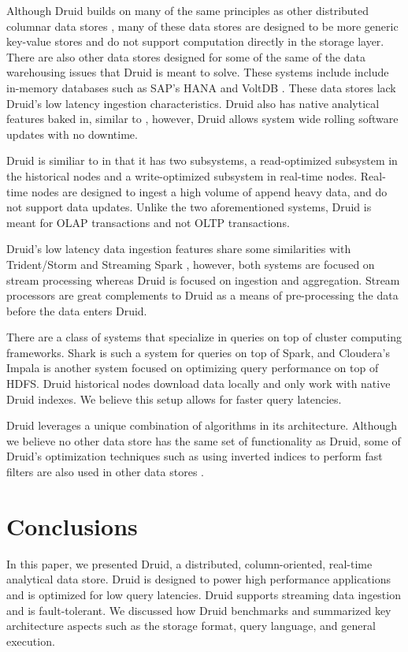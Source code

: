\documentclass{acm_proc_article-sp}
\begin{document}
Although Druid builds on many of the same principles as other distributed
columnar data stores \cite{fink2012distributed}, many of these data stores are
designed to be more generic key-value stores \cite{lakshman2010cassandra} and do not
support computation directly in the storage layer.  There are also other data
stores designed for some of the same of the data warehousing issues that Druid
is meant to solve. These systems include include in-memory databases such as
SAP’s HANA \cite{farber2012sap} and VoltDB \cite{voltdb2010voltdb}. These data
stores lack Druid's low latency ingestion characteristics. Druid also has
native analytical features baked in, similar to \cite{paraccel2013}, however,
Druid allows system wide rolling software updates with no downtime.  

Druid is similiar to \cite{stonebraker2005c, cipar2012lazybase} in that it has
two subsystems, a read-optimized subsystem in the historical nodes and a
write-optimized subsystem in real-time nodes. Real-time nodes are designed to
ingest a high volume of append heavy data, and do not support data updates.
Unlike the two aforementioned systems, Druid is meant for OLAP transactions and
not OLTP transactions.

Druid's low latency data ingestion features share some similarities with
Trident/Storm \cite{marz2013storm} and Streaming Spark
\cite{zaharia2012discretized}, however, both systems are focused on stream
processing whereas Druid is focused on ingestion and aggregation. Stream
processors are great complements to Druid as a means of pre-processing the data
before the data enters Druid.

There are a class of systems that specialize in queries on top of cluster
computing frameworks.  Shark \cite{engle2012shark} is such a system for queries
on top of Spark, and Cloudera's Impala \cite{cloudera2013} is another system
focused on optimizing query performance on top of HDFS. Druid historical nodes
download data locally and only work with native Druid indexes. We believe this
setup allows for faster query latencies.

Druid leverages a unique combination of algorithms in its
architecture. Although we believe no other data store has the same set
of functionality as Druid, some of Druid’s optimization techniques such as using
inverted indices to perform fast filters are also used in other data
stores \cite{macnicol2004sybase}.

\newpage
\section{Conclusions}
\label{sec:conclusions}
In this paper, we presented Druid, a distributed, column-oriented, real-time
analytical data store. Druid is designed to power high performance applications
and is optimized for low query latencies. Druid supports streaming data
ingestion and is fault-tolerant. We discussed how Druid benchmarks and
summarized key architecture aspects such
as the storage format, query language, and general execution.
\end{document}
